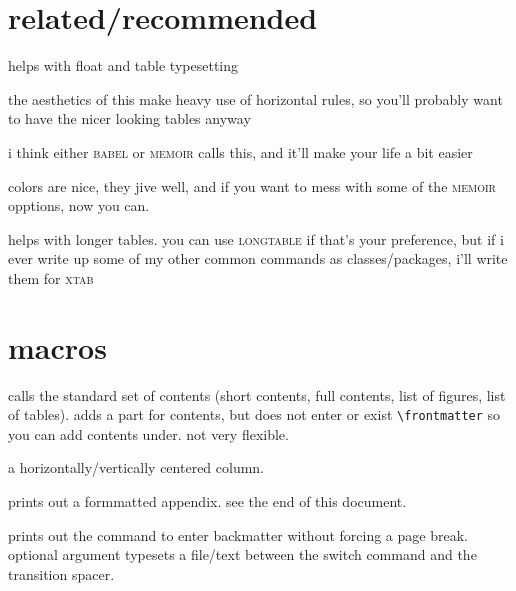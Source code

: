 \documentclass[lowerhead,12pt]{aesthetic}
\begin{document}
\section{related/recommended}
\begin{description}[font=\normalfont\scshape\ttfamily]
    \item[afterpage] helps with float and table typesetting
    \item[booktabs] the aesthetics of this make heavy use of horizontal rules, so you'll probably want to have the nicer looking tables anyway
    \item[csquotes] i think either {\scshape\ttfamily babel} or {\scshape\ttfamily memoir} calls this, and it'll make your life a bit easier
    \item[xcolor] colors are nice, they jive well, and if you want to mess with some of the {\scshape\ttfamily memoir} opptions, now you can.
    \item[xtab] helps with longer tables. you can use {\scshape\ttfamily longtable} if that's your preference, but if i ever write up some of my other common commands as classes/packages, i'll write them for {\scshape\ttfamily xtab}
\end{description}

\section{macros}\label{sec:macro}
\begin{description}[font=\ttfamily]
    \item[\textbackslash contents] calls the standard set of contents (short contents, full contents, list of figures, list of tables). adds a part for contents, but does not enter or exist \verb|\frontmatter| so you can add contents under. not very flexible.
    \item[M\{<width>\}] a horizontally/vertically centered column.
    \item[\textbackslash makeappendix] prints out a formmatted appendix. see the end of this document.
    \item[\textbackslash makebackmatter{[]}] prints out the command to enter backmatter without forcing a page break. optional argument typesets a file/text between the switch command and the transition spacer.
\end{description}
\end{document}
